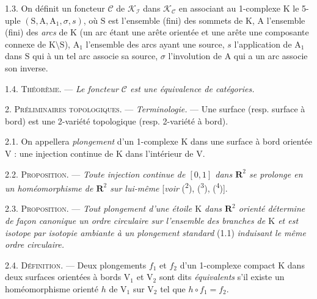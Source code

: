 1.3. On définit un foncteur \(\mathscr{C}\) de \(\mathscr{K}_{\mathscr I}\) dans \(\mathscr{K}_{\mathscr C}\) en associant au 1-complexe \(\mathrm{K}\) le 5-uple \((\mathrm{S},\mathrm{A},\mathrm{A}_1,\sigma,s)\), où \(\mathrm{S}\) est l'ensemble (fini) des sommets de \(\mathrm{K}\), \(\mathrm{A}\) l'ensemble (fini) des \textit{arcs} de \(\mathrm{K}\) (un arc étant une arête orientée et une arête une composante connexe de \(\mathrm{K}\setminus\mathrm{S}\)), \(\mathrm{A}_1\) l'ensemble des arcs ayant une source, \(s\) l'application de \(\mathrm{A}_1\) dans \(\mathrm{S}\) qui à un tel arc associe sa source, \(\sigma\) l'involution de \(\mathrm{A}\) qui a un arc associe son inverse.

1.4. \textsc{Théorème.} --- \textit{Le foncteur \(\mathscr{C}\) est une équivalence de catégories.}

2. \textsc{Préliminaires topologiques.} --- \textit{Terminologie.} --- Une surface (resp. surface à bord) est une 2-variété topologique (resp. 2-variété à bord).

2.1. On appellera \textit{plongement} d'un 1-complexe \(\mathrm{K}\) dans une surface à bord orientée \(\mathrm{V}\) : une injection continue de \(\mathrm{K}\) dans l'intérieur de \(\mathrm{V}\).

2.2. \textsc{Proposition.} --- \textit{Toute injection continue de \([0,1]\) dans \(\mathbf{R}^2\) se prolonge en un homéomorphisme de \(\mathbf{R}^2\) sur lui-même} [\textit{voir} (\textsuperscript{2}), (\textsuperscript{3}), (\textsuperscript{4})].

2.3. \textsc{Proposition.} --- \textit{Tout plongement d'une étoile \(\mathrm{K}\) dans \(\mathbf{R}^2\) orienté détermine de façon canonique un ordre circulaire sur l'ensemble des branches de \(\mathrm{K}\) et est isotope par isotopie ambiante à un plongement standard} (1.1) \textit{induisant le même ordre circulaire.}

2.4. \textsc{Définition.} --- Deux plongements \(f_1\) et \(f_2\) d'un 1-complexe compact \(\mathrm{K}\) dans deux surfaces orientées à bords \(\mathrm{V}_1\) et \(\mathrm{V}_2\) sont dits \textit{équivalents} s'il existe un homéomorphisme orienté \(h\) de \(\mathrm{V}_1\) sur \(\mathrm{V}_2\) tel que \(h\circ f_1=f_2\).

